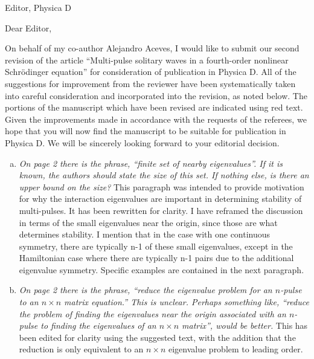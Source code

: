 \documentclass[11pt]{letter}
\begin{document}
\address{Ross Parker \\
Department of Mathematics \\
Southern Methodist University \\
Dallas, TX 75275 \\
\texttt{rhparker@smu.edu}}%
\signature{Ross Parker}
\begin{letter}{Editor, Physica D}

\opening{Dear Editor,}

On behalf of my co-author Alejandro Aceves, I would like to submit our second revision of the article ``Multi-pulse solitary waves in a fourth-order nonlinear {S}chr{\"o}dinger equation'' for consideration of publication in Physica D. All of the suggestions for improvement from the reviewer have been systematically taken into careful consideration and incorporated into the revision, as noted below. The portions of the manuscript which have been revised are indicated using red text. Given the improvements made in accordance with the requests of the referees, we hope that you will now find the manuscript to be suitable for publication in Physica D. We will be sincerely looking forward to your editorial decision.

\begin{enumerate}[(a)]
\item \emph{On page 2 there is the phrase, ``finite set of nearby eigenvalues''. If it is known, the authors should state the size of this set. If nothing else, is there an upper bound on the size?} This paragraph was intended to provide motivation for why the interaction eigenvalues are important in determining stability of multi-pulses. It has been rewritten for clarity. I have reframed the discussion in terms of the small eigenvalues near the origin, since those are what determines stability. I mention that in the case with one continuous symmetry, there are typically n-1 of these small eigenvalues, except in the Hamiltonian case where there are typically n-1 pairs due to the additional eigenvalue symmetry. Specific examples are contained in the next paragraph.

\item \emph{On page 2 there is the phrase, ``reduce the eigenvalue problem for an $n$-pulse to an $n\times n$ matrix equation.'' This is unclear. Perhaps something like, ``reduce the problem of finding the eigenvalues near the origin associated with an $n$-pulse to finding the eigenvalues of an $n\times n$ matrix'', would be better.} This has been edited for clarity using the suggested text, with the addition that the reduction is only equivalent to an $n\times n$ eigenvalue problem to leading order.


\end{enumerate}
\end{letter}
\end{document}

